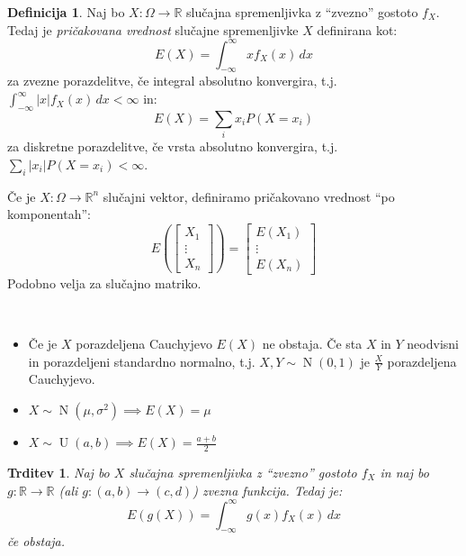 \documentclass[12pt]{book}
\def\n{\noindent}
\theoremstyle{definition}
\newtheorem{definicija}{Definicija}
\theoremstyle{plain}
\theoremstyle{plain}
\newtheorem{trditev}{Trditev}
\theoremstyle{plain}
\theoremstyle{plain}
\theoremstyle{remark}
\begin{document}
\begin{definicija}
    Naj bo $X: \Omega \rightarrow \mathbb{R}$ slučajna spremenljivka z “zvezno” gostoto $f_X$. Tedaj je \emph{pričakovana vrednost} slučajne spremenljivke $X$ definirana kot: 
    $$
    E(X)=\int_{-\infty}^{\infty} x f_X(x) \, d x
    $$ 
    za zvezne porazdelitve, če integral absolutno konvergira, t.j. $\int_{-\infty}^{\infty}|x| f_X(x) \, d x<\infty$ in:
    $$
    E(X)= \sum_{i} x_i P\left(X=x_i\right) 
    $$
    za diskretne porazdelitve, če vrsta absolutno konvergira, t.j. $\sum_{i} |x_i| P\left(X=x_i\right) < \infty$.

    \n Če je $X: \Omega \rightarrow \mathbb{R}^n$ slučajni vektor, definiramo pričakovano vrednost “po komponentah”: 
    $$
    E\left(\begin{bmatrix}
        X_1 \\
        \vdots \\
        X_n
        \end{bmatrix}\right)=\begin{bmatrix}
        E(X_1) \\
        \vdots \\
        E(X_n)
        \end{bmatrix}
    $$
    Podobno velja za slučajno matriko.
\end{definicija}

\begin{zgled}
    ~
    
    \begin{itemize}
        \item Če je $X$ porazdeljena Cauchyjevo $E(X)$ ne obstaja. Če sta $X$ in $Y$ neodvisni in porazdeljeni standardno normalno, t.j. $X, Y \sim \operatorname{N}(0, 1)$ je $\frac{X}{Y}$ porazdeljena Cauchyjevo. 
        \item $X \sim \operatorname{N}\left(\mu, \sigma^2\right) \implies E(X)=\mu$
        \item $X \sim \operatorname{U}(a, b) \implies E(X)=\frac{a+b}{2}$
    \end{itemize}
\end{zgled}

\begin{trditev}
    Naj bo $X$ slučajna spremenljivka z “zvezno” gostoto $f_X$ in naj bo $g: \mathbb{R} \to  \mathbb{R}$ (ali $g:(a, b) \rightarrow(c, d)$) zvezna funkcija. Tedaj je: 
    $$
    E(g(X))=\int_{-\infty}^{\infty} g(x) f_X(x) \, d x
    $$
    če obstaja. 
\end{trditev}
\end{document}
